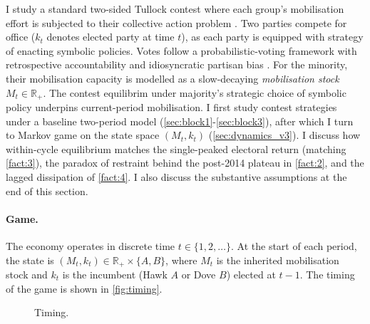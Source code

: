 \documentclass[11pt,twoside]{extarticle}
\begin{document}
I study a standard two-sided Tullock contest where each group's mobilisation effort is subjected to their collective action problem \citep*{ostromGoverningCommonsEvolution1990,skaperdasContestSuccessFunctions1996,jiaStochasticDerivationRatio2008}. 
Two parties compete for office ($k_t$ denotes elected party at time $t$), as each party is equipped with strategy of enacting symbolic policies. 
Votes follow a probabilistic-voting framework with retrospective accountability and idiosyncratic partisan bias \citep*{downsEconomicTheoryPolitical1957,barroControlPoliticiansEconomic1973,ferejohnIncumbentPerformanceElectoral1986}. 
For the minority, their mobilisation capacity is modelled as a slow-decaying \emph{mobilisation stock} $M_t\in\mathbb R_+$.
The contest equilibrim under majority's strategic choice of symbolic policy underpins current-period mobilisation.
I first study contest strategies under a baseline two-period model (\autoref{sec:block1}-\autoref{sec:block3}), after which I turn to Markov game on the state space $(M_t,k_t)$ (\autoref{sec:dynamics_v3}). 
I discuss how within-cycle equilibrium matches the single-peaked electoral return (matching \autoref{fact:3}), the paradox of restraint behind the post-2014 plateau in \autoref{fact:2}, and the lagged dissipation of \autoref{fact:4}. 
I also discuss the substantive assumptions at the end of this section.

\paragraph{Game.} The economy operates in discrete time $t\in\{1,2,\dots\}$. At the start of each period, the state is $(M_t,k_t)\in\mathbb R_+\times\{A,B\}$, where $M_t$ is the inherited mobilisation stock and $k_t$ is the incumbent (Hawk $A$ or Dove $B$) elected at $t-1$. The timing of the game is shown in \autoref{fig:timing}.

\begin{figure}[H]
\centering
{}
\caption{Timing.}
\label{fig:timing}
\end{figure}
\end{document}
